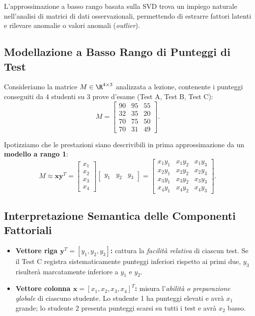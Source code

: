 L'approssimazione a basso rango basata sulla SVD trova un impiego naturale nell'analisi di matrici di dati osservazionali, permettendo di estrarre fattori latenti e rilevare anomalie o valori anomali (\textit{outlier}).

\subsection{Modellazione a Basso Rango di Punteggi di Test}

Consideriamo la matrice $M \in \R^{4 \times 3}$ analizzata a lezione, contenente i punteggi conseguiti da $4$ studenti su $3$ prove d'esame (Test A, Test B, Test C):
\begin{equation}
    M = \begin{bmatrix}
        90 & 95 & 55 \\
        32 & 35 & 20 \\
        70 & 75 & 50 \\
        70 & 31 & 49
    \end{bmatrix}.
\end{equation}

Ipotizziamo che le prestazioni siano descrivibili in prima approssimazione da un \textbf{modello a rango 1}:
\begin{equation}
    M \approx \mathbf{x} \mathbf{y}^T = \begin{bmatrix} x_1 \\ x_2 \\ x_3 \\ x_4 \end{bmatrix} \begin{bmatrix} y_1 & y_2 & y_3 \end{bmatrix} = \begin{bmatrix}
        x_1 y_1 & x_1 y_2 & x_1 y_3 \\
        x_2 y_1 & x_2 y_2 & x_2 y_3 \\
        x_3 y_1 & x_3 y_2 & x_3 y_3 \\
        x_4 y_1 & x_4 y_2 & x_4 y_3
    \end{bmatrix}.
\end{equation}

\subsection{Interpretazione Semantica delle Componenti Fattoriali}

\begin{itemize}
    \item \textbf{Vettore riga $\mathbf{y}^T = [y_1, y_2, y_3]$:} cattura la \textit{facilit\`a relativa} di ciascun test. Se il Test C registra sistematicamente punteggi inferiori rispetto ai primi due, $y_3$ risulter\`a marcatamente inferiore a $y_1$ e $y_2$.
    \item \textbf{Vettore colonna $\mathbf{x} = [x_1, x_2, x_3, x_4]^T$:} misura l'\textit{abilit\`a o preparazione globale} di ciascuno studente. Lo studente 1 ha punteggi elevati e avr\`a $x_1$ grande; lo studente 2 presenta punteggi scarsi su tutti i test e avr\`a $x_2$ basso.
\end{itemize}

